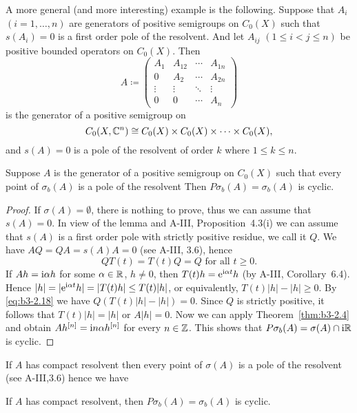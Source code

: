 A more general (and more interesting) example is the following.
Suppose that $A_{i}$ $(i = 1,\ldots,n)$ are generators of positive semigroups on $C_{0}(X)$ such that $s(A_{i}) = 0$ is a first order pole of the resolvent.
And let $A_{ij}$ $(1 \leq i < j \leq n)$ be positive bounded operators on $C_{0}(X)$.
Then
\[
A \coloneqq \begin{pmatrix}
	A_{1} & A_{12} & \cdots & A_{1n} \\
	0 & A_{2} & \cdots & A_{2n} \\
	\vdots & \vdots & \ddots & \vdots \\
	0 & 0 & \cdots & A_{n}
\end{pmatrix}
\]
is the generator of a positive semigroup on 
%
\[
	C_{0}(X,\mathbb{C}^{n}) \cong C_{0}(X) \times C_{0}(X) \times \cdots \times C_{0}(X) , 
\]
%
and $s(A) = 0$ is a pole of the resolvent of order $k$ where $1 \leq k \leq n$.
\begin{theorem}\label{thm:b3-2.9}
Suppose $A$ is the generator of a positive semigroup on $C_{0}(X)$ such that every point of $\sigma_{b}(A)$ is a pole of the resolvent
Then $P\sigma_{b}(A) = \sigma_{b}(A)$ is cyclic.
\end{theorem}
\begin{proof}
	If $\sigma(A) = \emptyset$, there is nothing to prove, thus we can assume that $s(A) = 0$.
	In view of the lemma and A-III, Proposition~4.3(i) we can assume that $s(A)$ is a first order pole with strictly positive residue, we call it $Q$.
	We have $AQ = QA = s(A)A = 0$ (see A-III, 3.6), hence
	\begin{equation}\label{eq:b3-2.18}
		QT(t) = T(t)Q = Q \text{ for all } t \geq 0.
	\end{equation}
	If $Ah = \mathrm{i}\alpha h$ for some $\alpha \in \mathbb{R}$, $h \neq 0$, then $T(t)h = \mathrm{e}^{\mathrm{i}\alpha t}h$ (by A-III, Corollary~6.4).
	Hence $|h| = |\mathrm{e}^{\mathrm{i}\alpha t}h| = |T(t)h| \leq T(t)|h|$, or equivalently, $T(t)|h| - |h| \geq 0$.
	By \eqref{eq:b3-2.18} we have $Q(T(t)|h| - |h|) = 0$.
	Since $Q$ is strictly positive, it follows that $T(t)|h| = |h|$ or $A|h| = 0$.
	Now we can apply Theorem~\ref{thm:b3-2.4} and obtain $Ah^{[n]} = \mathrm{i} n\alpha h^{[n]}$ for every $n \in \mathbb{Z}$.
	This shows that $P\sigma_{b}(A) = \sigma(A) \cap \mathrm{i}\mathbb{R}$ is cyclic.
\end{proof}
If $A$ has compact resolvent then every point of $\sigma(A)$ is a pole of the resolvent (see A-III,3.6) hence we have
\begin{corollary}\label{cor:b3-2.10}
If $A$ has compact resolvent, then $P\sigma_{b}(A) = \sigma_{b}(A)$ is cyclic.
\end{corollary}
